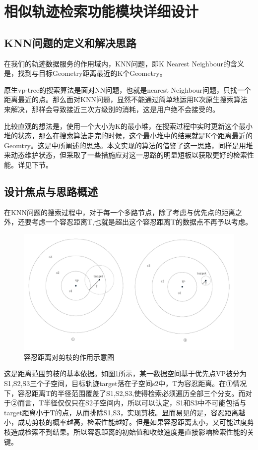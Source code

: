 \section{相似轨迹检索功能模块详细设计}

\subsection{KNN问题的定义和解决思路}
在我们的轨迹数据服务的作用域内，KNN问题，即K Nearest Neighbour的含义是，找到与目标Geometry距离最近的K个Geometry。

原生vp-tree的搜索算法是面对NN问题，也就是nearest Neighbour问题，只找一个距离最近的点。那么面对KNN问题，显然不能通过简单地运用K次原生搜索算法来解决，那样会导致接近三次方级别的消耗，这是用户绝不会接受的。

比较直观的想法是，使用一个大小为K的最小堆，在搜索过程中实时更新这个最小堆的状态，那么在搜索算法走完的时候，这个最小堆中的结果就是K个距离最近的Geomtry。这是\cite{DBLP:journals/vldb/FuCCM00}中所阐述的思路。本文实现的算法的借鉴了这一思路，同样是用堆来动态维护状态，但采取了一些措施应对这一思路的明显短板以获取更好的检索性能。详见下节。

\subsection{设计焦点与思路概述}
在KNN问题的搜索过程中，对于每一个多路节点，除了考虑与优先点的距离之外，还要考虑一个容忍距离T,也就是超出这个容忍距离T的数据点不再予以考虑。
\cite{DBLP:journals/classification/ProencaN17}
\begin{figure}[H]
  \centering
  \includegraphics[width=6in]{new_FIGs/chapter4/thredhold.pdf}
  \caption{容忍距离对剪枝的作用示意图}\label{thredhold}
\end{figure}
这是距离范围剪枝的基本依据。如图\ref{thredhold}所示，某一数据空间基于优先点VP被分为S1,S2,S3三个子空间，目标轨迹target落在子空间s2中，T为容忍距离。在①情况下，容忍距离T的半径范围覆盖了S1,S2,S3,使得检索必须遍历全部三个分支。而对于②而言，T半径仅仅只在S2子空间内，所以可以认定，S1和S3中不可能包括与target距离小于T的点，从而排除S1,S3，实现剪枝。显而易见的是，容忍距离越小，成功剪枝的概率越高，检索性能越好。但是如果容忍距离太小，又可能过度剪枝造成检索不到结果。所以容忍距离的初始值和收敛速度是直接影响检索性能的关键。\cite{DBLP:conf/hucc/ZengLJLCM14}

